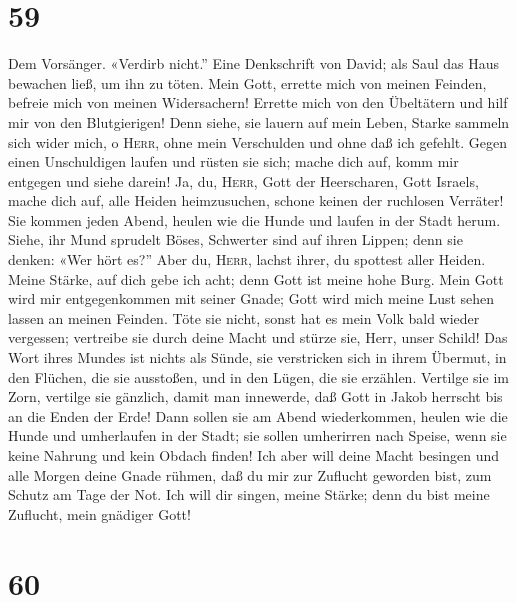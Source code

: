 \hypertarget{section-58}{%
\section{59}\label{section-58}}

 Dem Vorsänger. «Verdirb nicht.'' Eine Denkschrift von
David; als Saul das Haus bewachen ließ, um ihn zu töten. Mein Gott,
errette mich von meinen Feinden, befreie mich von meinen Widersachern!
 Errette mich von den Übeltätern und hilf mir von den
Blutgierigen!  Denn siehe, sie lauern auf mein Leben,
Starke sammeln sich wider mich, o \textsc{Herr}, ohne mein Verschulden
und ohne daß ich gefehlt.  Gegen einen Unschuldigen laufen
und rüsten sie sich; mache dich auf, komm mir entgegen und siehe darein!
 Ja, du, \textsc{Herr}, Gott der Heerscharen, Gott
Israels, mache dich auf, alle Heiden heimzusuchen, schone keinen der
ruchlosen Verräter!  Sie kommen jeden Abend, heulen wie
die Hunde und laufen in der Stadt herum.  Siehe, ihr Mund
sprudelt Böses, Schwerter sind auf ihren Lippen; denn sie denken: «Wer
hört es?''  Aber du, \textsc{Herr}, lachst ihrer, du
spottest aller Heiden.  Meine Stärke, auf dich gebe ich
acht; denn Gott ist meine hohe Burg.  Mein Gott wird mir
entgegenkommen mit seiner Gnade; Gott wird mich meine Lust sehen lassen
an meinen Feinden.  Töte sie nicht, sonst hat es mein
Volk bald wieder vergessen; vertreibe sie durch deine Macht und stürze
sie, Herr, unser Schild!  Das Wort ihres Mundes ist
nichts als Sünde, sie verstricken sich in ihrem Übermut, in den Flüchen,
die sie ausstoßen, und in den Lügen, die sie erzählen. 
Vertilge sie im Zorn, vertilge sie gänzlich, damit man innewerde, daß
Gott in Jakob herrscht bis an die Enden der Erde!  Dann
sollen sie am Abend wiederkommen, heulen wie die Hunde und umherlaufen
in der Stadt;  sie sollen umherirren nach Speise, wenn
sie keine Nahrung und kein Obdach finden!  Ich aber will
deine Macht besingen und alle Morgen deine Gnade rühmen, daß du mir zur
Zuflucht geworden bist, zum Schutz am Tage der Not.  Ich
will dir singen, meine Stärke; denn du bist meine Zuflucht, mein
gnädiger Gott!

\hypertarget{section-59}{%
\section{60}\label{section-59}}

